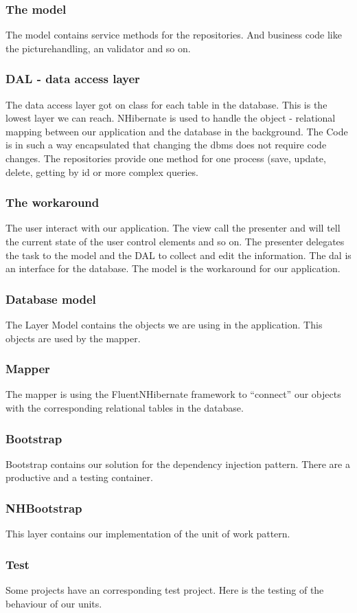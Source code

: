 \documentclass{article}
\begin{document}
\subsubsection{The model}
The model contains service methods for the repositories. And business code like
the picturehandling, an validator and so on.

\subsubsection{DAL - data access layer}
The data access layer got on class for each table in the database.
This is the lowest layer we can reach. NHibernate is used to handle the object
- relational mapping between our application and the database in the background.
The Code is in such a way encapsulated that changing the dbms does not
require code changes.
The repositories provide one method for one process (save, update, delete,
getting by id or more complex queries.

\subsubsection{The workaround}
The user interact with our application.
The view call the presenter and will tell the current state of the user control
elements and so on. The presenter delegates the task to the model and the DAL to
collect and edit the information. The dal is an interface for the database. The
model is the workaround for our application.

\subsubsection{Database model}
The Layer Model contains the objects we are using in the application.
This objects are used by the mapper.

\subsubsection{Mapper}
The mapper is using the FluentNHibernate framework to ``connect'' our objects
with the corresponding relational tables in the database.

\subsubsection{Bootstrap}
Bootstrap contains our solution for the dependency injection pattern.
There are a productive and a testing container.

\subsubsection{NHBootstrap}
This layer contains our implementation of the unit of work pattern.

\subsubsection{Test}
Some projects have an corresponding test project.
Here is the testing of the behaviour of our units.
\end{document}
